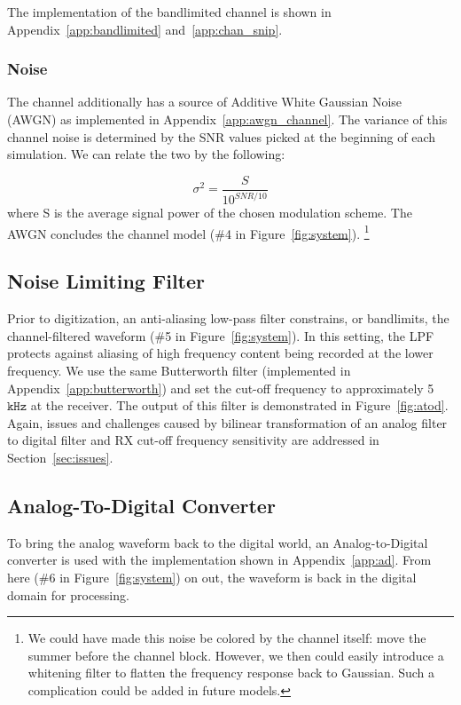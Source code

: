 \documentclass[]{article}
\begin{document}
The implementation of the bandlimited channel is shown in Appendix~\ref{app:bandlimited} and~\ref{app:chan_snip}.

\subsubsection{Noise}
\label{sec:awgn}
The channel additionally has a source of Additive White Gaussian Noise (AWGN) as implemented in Appendix~\ref{app:awgn_channel}. The variance of this channel noise is determined by the SNR values picked at the beginning of each simulation. We can relate the two by the following:

$$\sigma^2 = \frac{S}{10^{SNR/10}}$$
where S is the average signal power of the chosen modulation scheme.  The AWGN concludes the channel model (\#4 in Figure~\ref{fig:system}). \footnote{We could have made this noise be colored by the channel itself: move the summer before the channel block.  However, we then could easily introduce a whitening filter to flatten the frequency response back to Gaussian.  Such a complication could be added in future models.} 

\subsection{Noise Limiting Filter}
\label{sec:noiseLPF}
Prior to digitization, an anti-aliasing low-pass filter constrains, or bandlimits, the channel-filtered waveform (\#5 in Figure~\ref{fig:system}).  In this setting, the LPF protects against aliasing of high frequency content being recorded at the lower frequency.  We use the same Butterworth filter (implemented in Appendix~\ref{app:butterworth}) and set the cut-off frequency to approximately 5 $\mathtt{kHz}$ at the receiver. The output of this filter is demonstrated in Figure~\ref{fig:atod}. Again, issues and challenges caused by bilinear transformation of an analog filter to digital filter and RX cut-off frequency sensitivity are addressed in Section~\ref{sec:issues}.

\subsection{Analog-To-Digital Converter}
\label{sec:adc}
To bring the analog waveform back to the digital world, an Analog-to-Digital converter is used with the implementation shown in Appendix~\ref{app:ad}.  From here (\#6 in Figure~\ref{fig:system}) on out, the waveform is back in the digital domain for processing. \\
\end{document}
